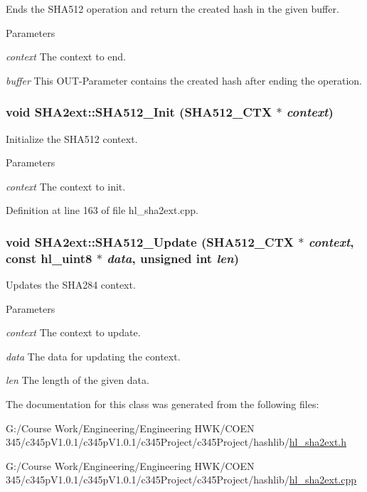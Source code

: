 Ends the SHA512 operation and return the created hash in the given buffer. 
\begin{DoxyParams}{Parameters}
\item[{\em context}]The context to end. \item[{\em buffer}]This OUT-\/Parameter contains the created hash after ending the operation. \end{DoxyParams}
\hypertarget{class_s_h_a2ext_aedf1c75293856456cbdba6c5aca62fdd}{
\subsubsection[{SHA512\_\-Init}]{\setlength{\rightskip}{0pt plus 5cm}void SHA2ext::SHA512\_\-Init ({\bf SHA512\_\-CTX} $\ast$ {\em context})}}
\label{class_s_h_a2ext_aedf1c75293856456cbdba6c5aca62fdd}


Initialize the SHA512 context. 
\begin{DoxyParams}{Parameters}
\item[{\em context}]The context to init. \end{DoxyParams}


Definition at line 163 of file hl\_\-sha2ext.cpp.\hypertarget{class_s_h_a2ext_a11dbee3c0b8423d99d1b6a2ab82578b8}{
\subsubsection[{SHA512\_\-Update}]{\setlength{\rightskip}{0pt plus 5cm}void SHA2ext::SHA512\_\-Update ({\bf SHA512\_\-CTX} $\ast$ {\em context}, \/  const {\bf hl\_\-uint8} $\ast$ {\em data}, \/  unsigned int {\em len})}}
\label{class_s_h_a2ext_a11dbee3c0b8423d99d1b6a2ab82578b8}


Updates the SHA284 context. 
\begin{DoxyParams}{Parameters}
\item[{\em context}]The context to update. \item[{\em data}]The data for updating the context. \item[{\em len}]The length of the given data. \end{DoxyParams}


The documentation for this class was generated from the following files:\begin{DoxyCompactItemize}
\item 
G:/Course Work/Engineering/Engineering HWK/COEN 345/c345pV1.0.1/c345pV1.0.1/c345Project/c345Project/hashlib/\hyperlink{hl__sha2ext_8h}{hl\_\-sha2ext.h}\item 
G:/Course Work/Engineering/Engineering HWK/COEN 345/c345pV1.0.1/c345pV1.0.1/c345Project/c345Project/hashlib/\hyperlink{hl__sha2ext_8cpp}{hl\_\-sha2ext.cpp}\end{DoxyCompactItemize}
